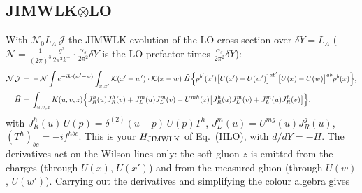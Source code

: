 \documentclass[10pt]{article}
\numberwithin{equation}{section}
\newcommand{\KK}{\mathcal K}
\newcommand{\NN}{\mathcal N}
\newcommand{\NO}{\mathcal N_0}
\newcommand{\LL}{L_\Lambda}
\newcommand{\J}{\mathcal J}
\begin{document}
\subsection{JIMWLK\texorpdfstring{$\otimes$}{x}LO}\label{sec:Jop}
With $\NO\LL\,\J$ the JIMWLK evolution of the LO cross section over $\delta Y=\LL$ ($\NN=\frac{1}{(2\pi)^3}\frac{g^2}{2\pi^2k^+}\cdot\frac{\alpha_s}{2\pi^2}\delta Y$ is the LO prefactor times $\frac{\alpha_s}{2\pi^2}\delta Y$):
\begin{align}
\NN\,\J={}&-\NN\int e^{-ik\cdot(w'-w)}\int_{x,x'}\KK(x'-w')\cdot\KK(x-w)\;\tilde H\Big\{\rho^{b'}(x')\big[U(x')-U(w')\big]^{ab'}\big[U(x)-U(w)\big]^{ab}\rho^b(x)\Big\},\notag\\
\tilde H={}&\int_{u,v,z}K(u,v,z)\Big\{J_R^h(u)J_R^h(v)+J_L^m(u)J_L^m(v)-U^{mh}(z)\big[J_R^h(u)J_L^m(v)+J_L^m(u)J_R^h(v)\big]\Big\},
\label{eq:Jop}
\end{align}
with $J_R^h(u)\,U(p)=\delta^{(2)}(u-p)\,U(p)T^h$, $J_L^m(u)=U^{mg}(u)J_R^g(u)$, $(T^h)_{bc}=-if^{hbc}$. This is your $H_{\rm JIMWLK}$ of Eq.~(HLO), with $d/dY=-H$. The derivatives act on the Wilson lines only: the soft gluon $z$ is emitted from the charges (through $U(x)$, $U(x')$) and from the measured gluon (through $U(w)$, $U(w')$). Carrying out the derivatives and simplifying the colour algebra gives
\end{document}
